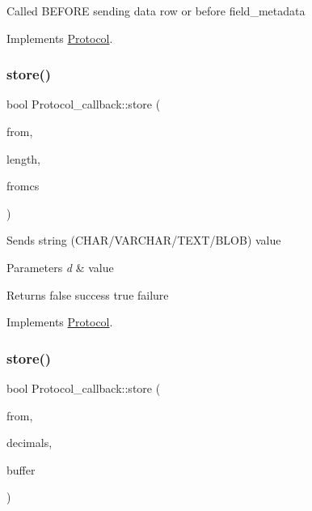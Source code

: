 Called B\+E\+F\+O\+RE sending data row or before field\+\_\+metadata 

Implements \mbox{\hyperlink{classProtocol_a6935bf41e00716012ba86e1f5c4b055b}{Protocol}}.

\mbox{\label{classProtocol__callback_a9dbe6210d73f4ef2ffb2aec2f98afe46}} 
\subsubsection{\texorpdfstring{store()}{store()}\hspace{0.1cm}{\footnotesize\ttfamily [1/5]}}
{\footnotesize\ttfamily bool Protocol\+\_\+callback\+::store (\begin{DoxyParamCaption}\item[{const char $\ast$}]{from,  }\item[{size\+\_\+t}]{length,  }\item[{const C\+H\+A\+R\+S\+E\+T\+\_\+\+I\+N\+FO $\ast$}]{fromcs }\end{DoxyParamCaption})\hspace{0.3cm}{\ttfamily [virtual]}}

Sends string (C\+H\+A\+R/\+V\+A\+R\+C\+H\+A\+R/\+T\+E\+X\+T/\+B\+L\+OB) value


\begin{DoxyParams}{Parameters}
{\em d} & value\\
\hline
\end{DoxyParams}
\begin{DoxyReturn}{Returns}
false success true failure 
\end{DoxyReturn}


Implements \mbox{\hyperlink{classProtocol}{Protocol}}.

\mbox{\label{classProtocol__callback_a69c9a82e85379db7e421eb30f834021a}} 
\subsubsection{\texorpdfstring{store()}{store()}\hspace{0.1cm}{\footnotesize\ttfamily [2/5]}}
{\footnotesize\ttfamily bool Protocol\+\_\+callback\+::store (\begin{DoxyParamCaption}\item[{float}]{from,  }\item[{uint32}]{decimals,  }\item[{String $\ast$}]{buffer }\end{DoxyParamCaption})\hspace{0.3cm}{\ttfamily [virtual]}}

